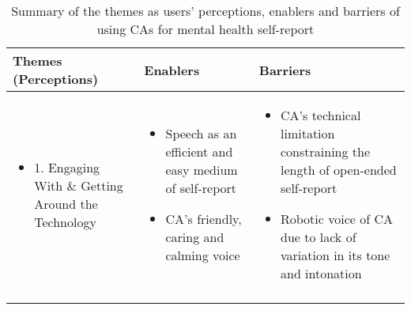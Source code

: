\begin{table}[h]
    \footnotesize
    \centering
    \caption{Summary of the themes as users' perceptions, enablers and barriers of using \ac{CA}s for mental health self-report}
    
    \begin{tabular}{p{3.20cm} p{4.65cm} p{4.65cm}}
        \toprule
        \textbf{Themes (Perceptions)}	& \textbf{Enablers}	& \textbf{Barriers}\\
        \midrule
            
            \begin{itemize}[leftmargin=0em]
                \item[] 1. Engaging With \& Getting Around the Technology
            \end{itemize}   
        & 
            \begin{itemize}[leftmargin=1em]
                \item Speech as an efficient and easy medium of self-report
                \item \ac{CA}'s friendly, caring and calming voice
            \end{itemize}
        &  
            \begin{itemize}[leftmargin=1em]
                \item \ac{CA}'s technical limitation constraining the length of open-ended self-report
                \item Robotic voice of \ac{CA} due to lack of variation in its tone and intonation
            \end{itemize}\\ \rowcolor[gray]{.95}  
            


\end{tabular}
\end{table}

